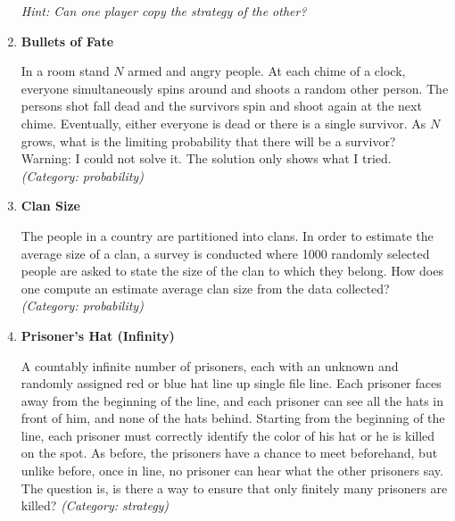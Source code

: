 \begin{enumerate}
\small\emph{Hint: Can one player copy the strategy of the other?}





\item \textbf{Bullets of Fate}

In a room stand $N$ armed and angry people. At each chime of a clock, everyone simultaneously spins around and shoots a random other person. The persons shot fall dead and the survivors spin and shoot again at the next chime. Eventually, either everyone is dead or there is a single survivor.
As $N$ grows, what is the limiting probability that there will be a survivor?
Warning: I could not solve it. The solution only shows what I tried.
\small\emph{(Category: probability)}




\item \textbf{Clan Size}

The people in a country are partitioned into clans.  In order to estimate the average size of a clan, a survey is conducted where 1000 randomly selected people are asked to state the size of the clan to which they belong.  How does one compute an estimate average clan size from the data collected?
\small\emph{(Category: probability)}




\item \textbf{Prisoner's Hat (Infinity)}

A countably infinite number of prisoners, each with an unknown and randomly assigned red or blue hat line up single file line. Each prisoner faces away from the beginning of the line, and each prisoner can see all the hats in front of him, and none of the hats behind. Starting from the beginning of the line, each prisoner must correctly identify the color of his hat or he is killed on the spot. As before, the prisoners have a chance to meet beforehand, but unlike before, once in line, no prisoner can hear what the other prisoners say. The question is, is there a way to ensure that only finitely many prisoners are killed?
\small\emph{(Category: strategy)}



\end{enumerate}
\newpage
